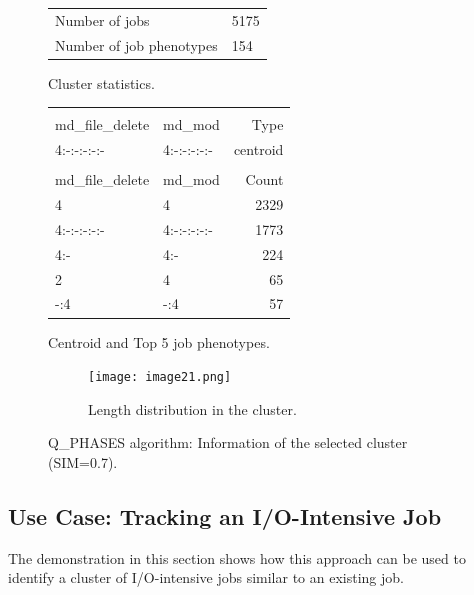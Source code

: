 \documentclass{jhps}
\begin{document}
\begin{figure}
	\begin{subtable}{\textwidth}
	 \centering
	 \begin{tabular}{ll}
		 Number of jobs & 5175 \\
		 Number of job phenotypes & 154 \\
	 \end{tabular}
	 \caption{Cluster statistics.}
	 \label{cluster:pm_quant:stats}
	\end{subtable}
	\medskip
	\begin{subtable}{\textwidth}
	 \centering
	 \begin{tiny}
		 \begin{tabular}{ll|r}
			 \rowcolor{tblhead}
			 \multicolumn{2}{l|}{Q-coding} &              \\
			 \rowcolor{tblhead}
			 md\_file\_delete     &  md\_mod     & Type     \\
			 \hline
			 4:-:-:-:-:-          &  4:-:-:-:-:- & centroid \\
			 \multicolumn{3}{l}{} \\
			 \rowcolor{tblhead}
			 md\_file\_delete     &  md\_mod     & Count    \\
			 \hline
			 4                    &  4           & 2329     \\
			 4:-:-:-:-:-          &  4:-:-:-:-:- & 1773     \\
			 4:-                  &  4:-         & 224      \\
			 2                    &  4           & 65       \\
			 -:4                  &  -:4         & 57       \\
		 \end{tabular}
	 \end{tiny}
	 \caption{Centroid and Top 5 job phenotypes.}
	 \label{cluster:pm_quant:top_jobs}
	\end{subtable}
	\medskip
	\begin{subfigure}{\textwidth}
		\centering
		\texttt{[image: image21.png]}
		\caption{Length distribution in the cluster.}
		\label{cluster:pm_quant:length}
	\end{subfigure}
	\caption{Q\_PHASES algorithm: Information of the selected cluster (SIM=0.7).}
	\label{cluster:pm_quant}
\end{figure}

\FloatBarrier
\subsection{Use Case: Tracking an I/O-Intensive Job}
The demonstration in this section shows how this approach can be used to identify a cluster of I/O-intensive jobs similar to an existing job.
\end{document}

